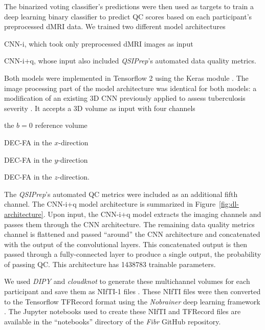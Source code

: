\documentclass[fleqn,10pt,inline]{wlscirep}
\begin{document}
The binarized voting classifier's predictions were then used as targets to train a deep
learning binary classifier to predict QC scores based on each participant's preprocessed
dMRI data. We trained two different model architectures
\begin{enumerate*}[%
    label=(\roman*),%
    before=\unskip{: },%
    itemjoin={{, }},%
    itemjoin*={{ and }}]
    \item CNN-i, which took only preprocessed dMRI images as input
    \item CNN-i+q, whose input also included \emph{QSIPrep}'s automated data quality metrics.
\end{enumerate*}
Both models were implemented in Tensorflow 2 \cite{tensorflow} using the Keras
module \cite{keras}. The image processing part of the model architecture was
identical for both models: a modification of an existing 3D CNN
\cite{zunair2020-bs} previously applied to assess tuberculosis severity
\cite{dicente2019clef}. It accepts a 3D volume as input with four channels
\begin{enumerate*}[%
    label=(\roman*),%
    before=\unskip{: },%
    itemjoin={{, }},%
    itemjoin*={{ and }}]
    \item the $b=0$ reference volume
    \item DEC-FA in the $x$-direction
    \item DEC-FA in the $y$-direction
    \item DEC-FA in the $z$-direction.
\end{enumerate*}
The \emph{QSIPrep}'s automated QC metrics were included as an additional fifth
channel. The CNN-i+q model architecture is summarized in
Figure~\ref{fig:dl-architecture}. Upon input, the CNN-i+q model extracts the
imaging channels and passes them through the CNN architecture. The remaining data quality
metrics channel is flattened and passed ``around'' the CNN architecture and
concatenated with the output of the convolutional layers. This concatenated
output is then passed through a fully-connected layer to produce a single
output, the probability of passing QC. This architecture has \num{1438783} trainable
parameters.

We used \emph{DIPY} \cite{dipy} and \emph{cloudknot} \cite{cloudknot} to
generate these multichannel volumes for each participant and save them as NIfTI-1
files \cite{nifti}. These NIfTI files were then converted to the Tensorflow
TFRecord format using the \emph{Nobrainer} deep learning framework
\cite{nobrainer}. The Jupyter notebooks used to create these NIfTI and TFRecord
files are available in the ``notebooks'' directory of the \emph{Fibr} GitHub
repository.
\end{document}
